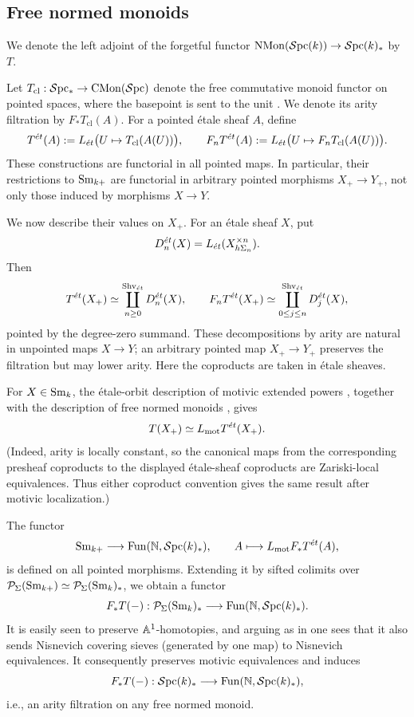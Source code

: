 \documentclass{amsart}
\renewcommand{\NB}[1]{}
\numberwithin{proposition}{section}
\numberwithin{equation}{section}
\def\NMon{\mathrm{NMon}}
\begin{document}
\subsection{Free normed monoids} \label{subsub:free-normed}
\begin{definition}
We denote the left adjoint of the forgetful functor $\NMon(\Spc(k)) \to \Spc(k)_*$ by $T$.
\end{definition}

Let $T_{\mathrm{cl}}:\mathcal{S}\mathrm{pc}{}_* \to \mathrm{CMon}(\mathcal{S}\mathrm{pc}{})$ denote the free commutative monoid functor on pointed spaces, where the basepoint is sent to the unit \cite[Remark~2.1.3.10 and Corollary~3.1.3.7]{lurie-ha}.
We denote its arity filtration \NB{ref?} by $F_* T_{\mathrm{cl}}(A)$.
For a pointed étale sheaf $A$, define
\[
T^{\acute{e}t}(A) := L_{\acute{e}t}\bigl(U \mapsto T_{\mathrm{cl}}(A(U))\bigr),
\qquad
F_nT^{\acute{e}t}(A) := L_{\acute{e}t}\bigl(U \mapsto F_nT_{\mathrm{cl}}(A(U))\bigr).
\]
These constructions are functorial in all pointed maps.
In particular, their restrictions to ${\mathrm{S}\mathrm{m}}_{k+}$ are functorial in arbitrary pointed morphisms $X_+ \to Y_+$, not only those induced by morphisms $X \to Y$.

We now describe their values on $X_+$.
For an étale sheaf $X$, put
\[
D_n^{\acute{e}t}(X) = L_{\acute{e}t}(X^{\times n}_{h\Sigma_n}).
\]
Then
\[
T^{\acute{e}t}(X_+) \simeq \coprod_{n\ge 0}^{\mathrm{S}\mathrm{hv}_{\acute{e}t}} D_n^{\acute{e}t}(X),
\qquad
F_nT^{\acute{e}t}(X_+) \simeq \coprod_{0\le j\le n}^{\mathrm{S}\mathrm{hv}_{\acute{e}t}} D_j^{\acute{e}t}(X),
\]
pointed by the degree-zero summand.
These decompositions by arity are natural in unpointed maps $X \to Y$; an arbitrary pointed map $X_+ \to Y_+$ preserves the filtration but may lower arity.
Here the coproducts are taken in étale sheaves.

For $X \in {\mathrm{S}\mathrm{m}}_k$, the étale-orbit description of motivic extended powers \cite[Proposition~5.23]{bachmann-colimits}, together with the description of free normed monoids \cite[Lemma~3.24 and Corollary~3.28]{bachmann-MGM}, gives
\[
T(X_+) \simeq L_{\mathrm{mot}} T^{\acute{e}t}(X_+).
\]
(Indeed, arity is locally constant, so the canonical maps from the corresponding presheaf coproducts to the displayed étale-sheaf coproducts are Zariski-local equivalences.
Thus either coproduct convention gives the same result after motivic localization.)

The functor
\[
{\mathrm{S}\mathrm{m}}_{k+} \longrightarrow \mathrm{Fun}(\mathbb{N},\mathcal{S}\mathrm{pc}{}(k)_*),
\qquad
A \longmapsto L_{\mathrm{mot}} F_*T^{\acute{e}t}(A),
\]
is defined on all pointed morphisms.
Extending it by sifted colimits over $\mathcal{P}_\Sigma({\mathrm{S}\mathrm{m}}_{k+}) \simeq \mathcal{P}_\Sigma({\mathrm{S}\mathrm{m}}_k)_*$, we obtain a functor
\[
F_*T(\mathord-): \mathcal{P}_\Sigma({\mathrm{S}\mathrm{m}}_k)_* \longrightarrow \mathrm{Fun}(\mathbb{N},\mathcal{S}\mathrm{pc}{}(k)_*).
\]
It is easily seen to preserve $\mathbb A^1$-homotopies, and arguing as in \cite[Proposition~2.1.5(iii)]{EHKSY} one sees that it also sends Nisnevich covering sieves (generated by one map) to Nisnevich equivalences.\NB{details?}
It consequently preserves motivic equivalences and induces
\[
F_*T(\mathord-): \mathcal{S}\mathrm{pc}{}(k)_* \longrightarrow \mathrm{Fun}(\mathbb{N},\mathcal{S}\mathrm{pc}{}(k)_*),
\]
i.e., an arity filtration on any free normed monoid.
\end{document}
